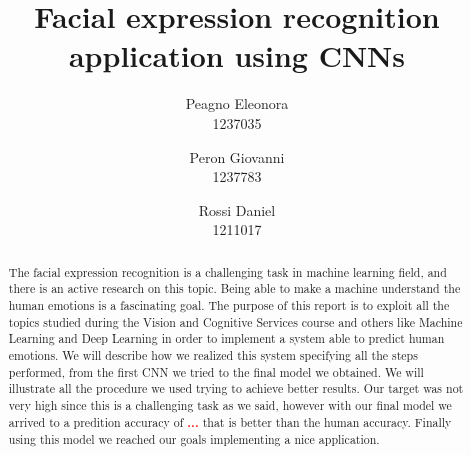 \documentclass[10pt,twocolumn,letterpaper]{article}
\begin{document}
\title{Facial expression recognition application using CNNs}

\author{
   Peagno Eleonora \\\normalsize 1237035\\
   \and
   Peron Giovanni \\\normalsize 1237783\\
   \and
   Rossi Daniel \\\normalsize 1211017\\
}

\maketitle

\begin{abstract}
   The facial expression recognition is a challenging task in machine learning field,
   and there is an active research on this topic. Being able to make a machine understand
   the human emotions is a fascinating goal.
   The purpose of this report is to exploit all the topics studied during
   the Vision and Cognitive Services course and others like Machine Learning and Deep Learning
   in order to implement a system able to predict human emotions.
   We will describe how we realized this system specifying all the steps performed,
   from the first CNN we tried to the final model we obtained.
   We will illustrate all the procedure we used trying to achieve better results.
   Our target was not very high since this is a challenging task as we said, however
   with our final model we arrived to a predition accuracy of \textbf{\textcolor{red}{...}} that is better than the human accuracy.
   Finally using this model we reached our goals implementing a nice application.
\end{abstract}
\end{document}
